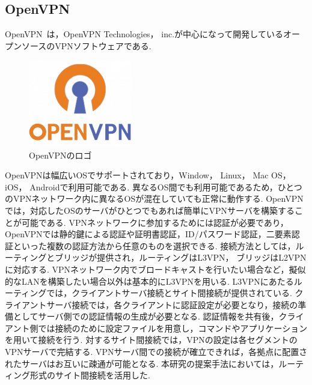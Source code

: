 \subsection{OpenVPN}

OpenVPN~\cite{OpenVPN}は，OpenVPN Technologies， inc.が中心になって開発しているオープンソースのVPNソフトウェアである.

\begin{figure}[htbp]
\begin{center}
    \includegraphics[width=0.4\textwidth]{./figures/openvpn-logo.png}
    \caption{OpenVPNのロゴ}
\end{center}
\end{figure}

OpenVPNは幅広いOSでサポートされており，Window， Linux， Mac OS， iOS， Androidで利用可能である.
異なるOS間でも利用可能であるため，ひとつのVPNネットワーク内に異なるOSが混在していても正常に動作する.
OpenVPNでは，対応したOSのサーバがひとつでもあれば簡単にVPNサーバを構築することが可能である.
VPNネットワークに参加するためには認証が必要であり，OpenVPNでは静的鍵による認証や証明書認証，ID/パスワード認証，二要素認証といった複数の認証方法から任意のものを選択できる.
接続方法としては，ルーティングとブリッジが提供され，ルーティングはL3VPN， ブリッジはL2VPNに対応する.
VPNネットワーク内でブロードキャストを行いたい場合など，擬似的なLANを構築したい場合以外は基本的にL3VPNを用いる.
L3VPNにあたるルーティングでは，クライアントサーバ接続とサイト間接続が提供されている.
クライアントサーバ接続では，各クライアントに認証設定が必要となり，接続の準備としてサーバ側での認証情報の生成が必要となる.
認証情報を共有後，クライアント側では接続のために設定ファイルを用意し，コマンドやアプリケーションを用いて接続を行う.
対するサイト間接続では，VPNの設定は各セグメントのVPNサーバで完結する.
VPNサーバ間での接続が確立できれば，各拠点に配置されたサーバはお互いに疎通が可能となる.
本研究の提案手法においては，ルーティング形式のサイト間接続を活用した.
